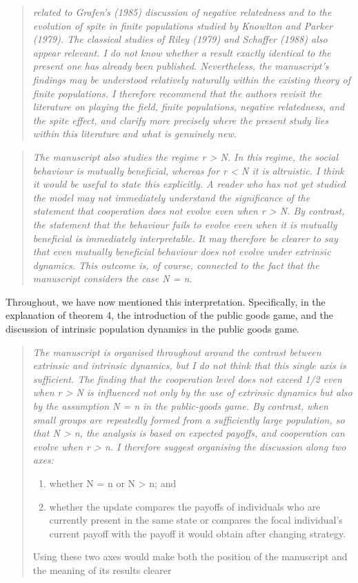 \documentclass[11pt]{article}
\newenvironment{reviewerquote}
  {\begin{quote}\itshape}
  {\end{quote}}
\begin{document}
\begin{reviewerquote}
  related to Grafen's (1985) discussion of negative relatedness and to the evolution of spite in finite populations
  studied by Knowlton and Parker (1979). The classical studies of Riley (1979) and Schaffer (1988) also
  appear relevant.
  I do not know whether a result exactly identical to the present one has already been published. Nevertheless,
  the manuscript's findings may be understood relatively naturally within the existing theory of finite
  populations. I therefore recommend that the authors revisit the literature on playing the field, finite
  populations, negative relatedness, and the spite effect, and clarify more precisely where the present study lies
  within this literature and what is genuinely new. 
\end{reviewerquote}


\begin{reviewerquote}
  The manuscript also studies the regime r > N. In this regime, the social behaviour is mutually beneficial,
  whereas for r < N it is altruistic. I think it would be useful to state this explicitly. A reader who has not yet
  studied the model may not immediately understand the significance of the statement that cooperation does
  not evolve even when r > N. By contrast, the statement that the behaviour fails to evolve even when it is
  mutually beneficial is immediately interpretable. It may therefore be clearer to say that even mutually
  beneficial behaviour does not evolve under extrinsic dynamics. This outcome is, of course, connected to the
  fact that the manuscript considers the case N = n.
\end{reviewerquote}

Throughout, we have now mentioned this interpretation. Specifically, in the
explanation of theorem 4, the introduction of the public goods game, and the
discussion of intrinsic population dynamics in the public goods game.

\begin{reviewerquote}
  The manuscript is organised throughout around the contrast between extrinsic and intrinsic dynamics, but I
  do not think that this single axis is sufficient. The finding that the cooperation level does not exceed 1/2 even
  when r > N is influenced not only by the use of extrinsic dynamics but also by the assumption N = n in the
  public-goods game.
  By contrast, when small groups are repeatedly formed from a sufficiently large population, so that N > n, the
  analysis is based on expected payoffs, and cooperation can evolve when r > n.
  I therefore suggest organising the discussion along two axes:
  \begin{enumerate}
   \item whether N = n or N > n; and
   \item whether the update compares the payoffs of individuals who are currently present in the same state or
    compares the focal individual's current payoff with the payoff it would obtain after changing strategy.
  \end{enumerate}
  Using these two axes would make both the position of the manuscript and the meaning of its results clearer
\end{reviewerquote}
\end{document}
